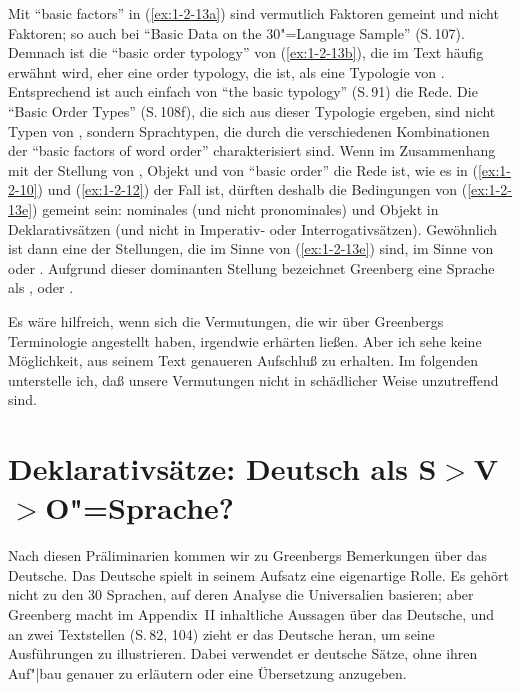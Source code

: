 \documentclass[output=paper]{langsci/langscibook}
\begin{document}
Mit "`basic factors"' in (\ref{ex:1-2-13a}) sind vermutlich
 Faktoren gemeint und nicht
 Faktoren; so auch bei "`Basic Data
on the 30"=Language Sample"' (S.\,107). Demnach ist die "`basic order
typology"' von (\ref{ex:1-2-13b}), die im Text häufig erwähnt wird,
eher eine order typology, die  ist, als eine Typologie
von . Entsprechend ist auch einfach von "`the
basic typology"' (S.\,91) die Rede. Die "`Basic Order Types"' (S.\,108f),
die sich aus dieser Typologie ergeben, sind nicht Typen von
, sondern Sprachtypen, die durch die
verschiedenen Kombinationen der "`basic factors of word order"'
charakterisiert sind. Wenn im Zusammenhang mit der Stellung von
, Objekt und  von "`basic order"' die Rede ist, wie es in
(\ref{ex:1-2-10}) und (\ref{ex:1-2-12}) der Fall ist, dürften deshalb
die Bedingungen von (\ref{ex:1-2-13e}) gemeint sein: nominales (und
nicht pronominales)  und Objekt in Deklarativsätzen (und nicht
\zb in Imperativ- oder Interrogativsätzen). Gewöhnlich ist dann
eine der Stellungen, die im Sinne von (\ref{ex:1-2-13e})
 sind,  im Sinne von 
oder . Aufgrund dieser dominanten Stellung bezeichnet
Greenberg eine Sprache als ,
 oder .


Es wäre hilfreich, wenn sich die Vermutungen, die wir über Greenbergs Terminologie angestellt haben, irgendwie erhärten ließen. Aber ich sehe keine Möglichkeit,
aus seinem Text genaueren Aufschluß zu erhalten. Im folgenden unterstelle ich, daß
unsere Vermutungen nicht in schädlicher Weise unzutreffend sind.


\section{Deklarativsätze: Deutsch als S$>$V$>$O"=Sprache?}%
\label{sec:1-3}


Nach diesen Präliminarien kommen wir zu Greenbergs Bemerkungen über das
Deutsche. Das Deutsche spielt in seinem Aufsatz eine eigenartige Rolle. Es gehört
nicht zu den 30 Sprachen, auf deren Analyse die Universalien basieren; aber Greenberg macht im Appendix~II inhaltliche Aussagen über das Deutsche, und an zwei
Textstellen (S.\,82, 104) zieht er das Deutsche heran, um seine Ausführungen zu illustrieren. Dabei verwendet er deutsche Sätze, ohne ihren Auf"|bau genauer zu erläutern oder eine Übersetzung anzugeben.
\end{document}
